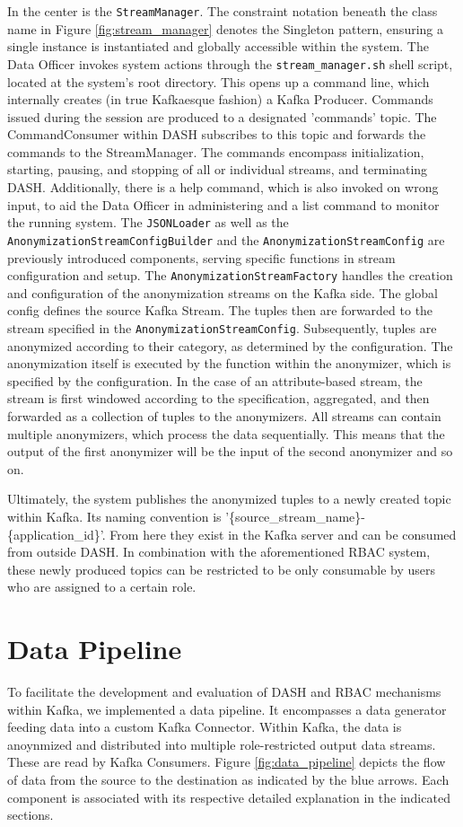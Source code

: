 In the center is the \texttt{StreamManager}. The constraint notation beneath the class name in Figure \ref{fig:stream_manager} denotes the Singleton pattern, ensuring a single instance is instantiated and globally accessible within the system. The Data Officer invokes system actions through the \texttt{stream\_manager.sh} shell script, located at the system's root directory. This opens up a command line, which internally creates (in true Kafkaesque fashion) a Kafka Producer. Commands issued during the session are produced to a designated 'commands' topic. The CommandConsumer within DASH subscribes to this topic and forwards the commands to the StreamManager. The commands encompass initialization, starting, pausing, and stopping of all or individual streams, and terminating \ac{DASH}. Additionally, there is a help command, which is also invoked on wrong input, to aid the Data Officer in administering and a list command to monitor the running system.
The \texttt{JSONLoader} as well as the \texttt{AnonymizationStreamConfigBuilder} and the \texttt{AnonymizationStreamConfig} are previously introduced components, serving specific functions in stream configuration and setup. The \texttt{AnonymizationStreamFactory} handles the creation and configuration of the anonymization streams on the Kafka side. The global config defines the source Kafka Stream. The tuples then are forwarded to the stream specified in the \texttt{AnonymizationStreamConfig}. Subsequently, tuples are anonymized according to their category, as determined by the configuration. The anonymization itself is executed by the function within the anonymizer, which is specified by the configuration. In the case of an attribute-based stream, the stream is first windowed according to the specification, aggregated, and then forwarded as a collection of tuples to the anonymizers. All streams can contain multiple anonymizers, which process the data sequentially. This means that the output of the first anonymizer will be the input of the second anonymizer and so on.\par
Ultimately, the system publishes the anonymized tuples to a newly created topic within Kafka. Its naming convention is '\{source\_stream\_name\}-\{application\_id\}'. From here they exist in the Kafka server and can be consumed from outside \ac{DASH}. In combination with the aforementioned RBAC system, these newly produced topics can be restricted to be only consumable by users who are assigned to a certain role. 

\section{Data Pipeline}
To facilitate the development and evaluation of \ac{DASH} and \ac{RBAC} mechanisms within Kafka, we implemented a data pipeline. It encompasses a data generator feeding data into a custom Kafka Connector. Within Kafka, the data is anoynmized and distributed into multiple role-restricted output data streams. These are read by Kafka Consumers. Figure \ref{fig:data_pipeline} depicts the flow of data from the source to the destination as indicated by the blue arrows. Each component is associated with its respective detailed explanation in the indicated sections. 

